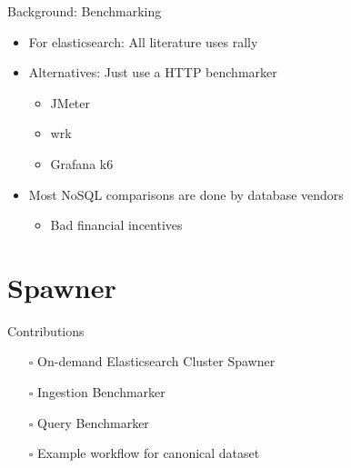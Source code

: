 \documentclass[compress,aspectratio=169]{beamer}
\newcommand{\ccheckbox}{\mbox{$\square$}}
\begin{document}
  \begin{frame}{Background: Benchmarking}
    \begin{itemize}
      \item For elasticsearch: All literature uses rally \cite{rallyusecase1} \cite{rallyusecase2} \cite{rallyusecase3}
      \item Alternatives: Just use a HTTP benchmarker
        \begin{itemize}
          \item JMeter \cite{jmeter}
          \item wrk \cite{wrk}
          \item Grafana k6 \cite{k6}
        \end{itemize}
      \item Most NoSQL comparisons are done by database vendors \cite{tsbs}
        \begin{itemize}
          \item Bad financial incentives
        \end{itemize}
    \end{itemize}
  \end{frame}

	\section{Spawner}
  \begin{frame}{Contributions}
    \begin{center}
      \begin{itemize}
        \item[\ccheckbox] On-demand Elasticsearch Cluster Spawner
        \item[\ccheckbox] Ingestion Benchmarker
        \item[\ccheckbox] Query Benchmarker
        \item[\ccheckbox] Example workflow for canonical dataset
      \end{itemize}
    \end{center}
  \end{frame}
\end{document}
